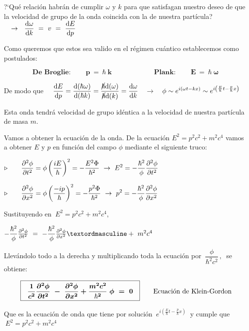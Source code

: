 ?`Qué relación habrán de cumplir $\omega$ y $k$ para que satisfagan nuestro deseo de que la velocidad de grupo de la onda coincida con la de nuestra partícula? $\quad \to \ \ \displaystyle \dv{\omega}{k} \ = \ v \ = \ \dv{E}{p} $

Como queremos que estos sea valido en el régimen cuántico establecemos como postulados:

$$\textbf{De Broglie:} \qquad \boxed{\ \boldsymbol{p \ = \ \hbar \ k} \ }
\qquad \qquad \qquad 
\textbf{Plank:} \qquad \boxed{\ \boldsymbol{ E \ = \ \hbar \ \omega \ } }$$


De modo que $\quad \displaystyle \dv{E}{p}=\dfrac{\mathrm{d}(\hbar \omega)}{\mathrm{d}(\hbar k)}=\dfrac{\cancel{\hbar} \mathrm{d}( \omega)}{\cancel{\hbar} \mathrm{d}( k)}=\dv{\omega}{k} \quad \to \quad \phi \sim e^{i(\omega t - kx)} \sim e^{i\left( \frac E \hbar t - \frac p \hbar x \right)}   $

Esta onda tendrá velocidad de grupo idéntica a la velocidad de nuestra partícula de masa $m$.

Vamos a obtener la ecuación de la onda. De la ecuación $E^2=p^2c^2+m^2c^4$ vamos a obtener $E$ y $p$ en función del campo $\phi$ mediante el siguiente truco:

$\triangleright \qquad  \displaystyle \pdv[2]{\phi}{t}=\phi \left(\dfrac{iE}{\hbar}\right)^2=-\dfrac{E^2\Phi}{\hbar^2} \ \to \ E^2=-\dfrac{\hbar^2}{\phi} \pdv[2]{\phi}{t}$


$\triangleright \qquad  \displaystyle \pdv[2]{\phi}{x}=\phi \left(\dfrac{-ip}{\hbar}\right)^2=-\dfrac{p^2\Phi}{\hbar^2} \ \to \ p^2=-\dfrac{\hbar^2}{\phi} \pdv[2]{\phi}{x}$

Sustituyendo en $\ E^2=p^2c^2+m^2c^4$,

$-\dfrac{\hbar^2}{\phi} \pdv[2]{\phi}{t} \ = \ -\dfrac{\hbar^2}{\phi} \pdv[2]{\phi}{x} º + \ m^2c^4$

Llevándolo todo a la derecha y multiplicando toda la ecuación por $\ \dfrac{\phi}{\hbar^2c^2}\, , \ $ se obtiene:

\begin{equation}
\label{T33EcK-G}
\boldsymbol{ \boxed{\ \  
\dfrac 1 {c^2} \pdv[2]{\phi}{t} \ - \ \pdv[2]{\phi}{x} + \dfrac{m^2c^2}{\hbar^2}\ \phi \ = \ 0
 \ \ } }	\qquad \text{Ecuación de Klein-Gordon}
\end{equation}

Que es la ecuación de onda que tiene por solución $\ e^{i\left( \frac E \hbar t - \frac p \hbar x \right)}\ $ y cumple que $\ E^2=p^2c^2+m^2c^4$

